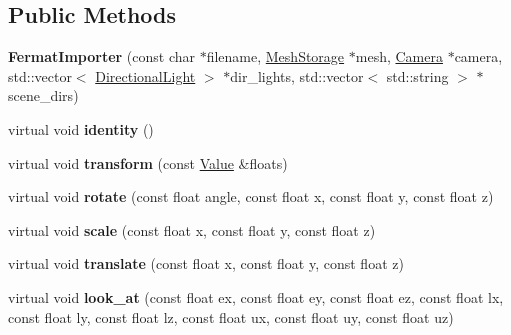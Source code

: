 \subsection*{Public Methods}
\begin{DoxyCompactItemize}
\item 
\mbox{\label{structpbrt_1_1_fermat_importer_ac01d0672a20956f1bfceed58c391a072}} 
{\bfseries Fermat\+Importer} (const char $\ast$filename, \hyperlink{class_mesh_storage}{Mesh\+Storage} $\ast$mesh, \hyperlink{struct_camera}{Camera} $\ast$camera, std\+::vector$<$ \hyperlink{struct_directional_light}{Directional\+Light} $>$ $\ast$dir\+\_\+lights, std\+::vector$<$ std\+::string $>$ $\ast$scene\+\_\+dirs)
\item 
\mbox{\label{structpbrt_1_1_fermat_importer_a629b96e7a653726d1b96de5d3dc06b28}} 
virtual void {\bfseries identity} ()
\item 
\mbox{\label{structpbrt_1_1_fermat_importer_a04902349e2bab1814819d26db89e6727}} 
virtual void {\bfseries transform} (const \hyperlink{structpbrt_1_1_value}{Value} \&floats)
\item 
\mbox{\label{structpbrt_1_1_fermat_importer_a9c99ea82488f03edf2f00cf21bd429e1}} 
virtual void {\bfseries rotate} (const float angle, const float x, const float y, const float z)
\item 
\mbox{\label{structpbrt_1_1_fermat_importer_ad851d9884a79729de1fbb0528b540213}} 
virtual void {\bfseries scale} (const float x, const float y, const float z)
\item 
\mbox{\label{structpbrt_1_1_fermat_importer_afe9f3f8a47e6d6fd227fa8bae64b69a9}} 
virtual void {\bfseries translate} (const float x, const float y, const float z)
\item 
\mbox{\label{structpbrt_1_1_fermat_importer_a6d80a936da43f165e0e4ae9a57229eba}} 
virtual void {\bfseries look\+\_\+at} (const float ex, const float ey, const float ez, const float lx, const float ly, const float lz, const float ux, const float uy, const float uz)
\item 

\end{DoxyCompactItemize}

